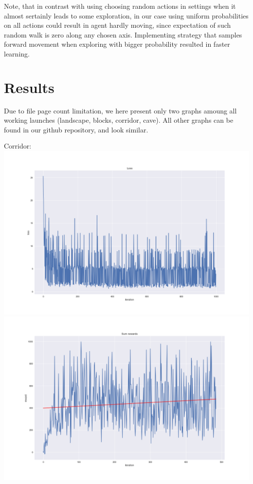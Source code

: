 \documentclass{article}
\begin{document}
Note, that in contrast with using choosing random actions in settings when it almost sertainly leads to some exploration, in our case using uniform probabilities on all actions could result in agent hardly moving, since expectation of such random walk is zero along any chosen axis. Implementing strategy that samples forward movement when exploring with bigger probability resulted in faster learning.  

\section{Results}

Due to file page count limitation, we here present 
only two graphs amoung all working launches (landscape, blocks, corridor, cave).
All other graphs can be found in our github repository, and look similar.

Corridor:
\includegraphics[scale=0.2]{plots/corridor_loss.png}
\includegraphics[scale=0.2]{plots/corridor_rewards.png}
\end{document}

